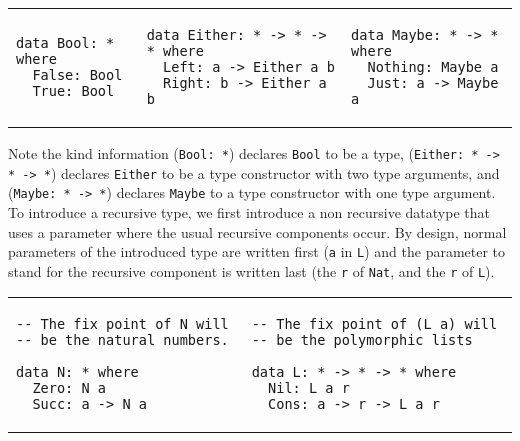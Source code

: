 \vspace*{0.1in}
\begin{tabular}{l|l|l}
\begin{minipage}[t]{.25\linewidth}
{\small
\begin{verbatim}
data Bool: * where
  False: Bool
  True: Bool
\end{verbatim}}
\end{minipage}

& 

\begin{minipage}[t]{.38\linewidth}
{\small
\begin{verbatim}
data Either: * -> * -> * where 
  Left: a -> Either a b
  Right: b -> Either a b
\end{verbatim}}
\end{minipage}

&

\begin{minipage}[t]{.26\linewidth}
{\small
\begin{verbatim}
data Maybe: * -> * where
  Nothing: Maybe a
  Just: a -> Maybe a  
\end{verbatim}}
\end{minipage}
\end{tabular}

\vspace*{0.1in}
Note the kind information
(\verb+Bool: *+) declares \verb+Bool+ to be a type, (\verb+Either: * -> * -> *+) declares
\verb+Either+ to be a type constructor with two type arguments, and 
(\verb+Maybe: * -> *+) declares \verb+Maybe+ to a type constructor
with one type argument.
To introduce a recursive type, we first introduce a non recursive datatype
that uses a parameter where the usual recursive components occur. By design,
normal parameters of the introduced type are written first (\verb+a+ in \verb+L+)
and the parameter to stand for the recursive component is written last
(the \verb+r+ of \verb+Nat+, and the \verb+r+ of \verb+L+).



\vspace*{0.1in}
\begin{tabular}{l|l}
\begin{minipage}[t]{.40\linewidth}
{\small
\begin{verbatim}
-- The fix point of N will 
-- be the natural numbers.

data N: * where
  Zero: N a
  Succ: a -> N a
\end{verbatim}}
\end{minipage}

& 

\begin{minipage}[t]{.40\linewidth}
{\small
\begin{verbatim}
-- The fix point of (L a) will 
-- be the polymorphic lists  

data L: * -> * -> * where
  Nil: L a r
  Cons: a -> r -> L a r
\end{verbatim}}
\end{minipage}
\end{tabular}

